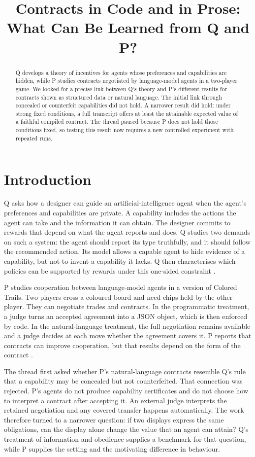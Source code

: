 \documentclass{article}
\title{Contracts in Code and in Prose: What Can Be Learned from Q and P?}
\author{}
\date{}
\begin{document}
\maketitle

\begin{abstract}
Q develops a theory of incentives for agents whose preferences and capabilities are hidden, while P studies contracts negotiated by language-model agents in a two-player game. We looked for a precise link between Q's theory and P's different results for contracts shown as structured data or natural language. The initial link through concealed or counterfeit capabilities did not hold. A narrower result did hold: under strong fixed conditions, a full transcript offers at least the attainable expected value of a faithful compiled contract. The thread paused because P does not hold those conditions fixed, so testing this result now requires a new controlled experiment with repeated runs.
\end{abstract}

\section{Introduction}

Q asks how a designer can guide an artificial-intelligence agent when the agent's preferences and capabilities are private. A capability includes the actions the agent can take and the information it can obtain. The designer commits to rewards that depend on what the agent reports and does. Q studies two demands on such a system: the agent should report its type truthfully, and it should follow the recommended action. Its model allows a capable agent to hide evidence of a capability, but not to invent a capability it lacks. Q then characterises which policies can be supported by rewards under this one-sided constraint \cite{Q}.

P studies cooperation between language-model agents in a version of Colored Trails. Two players cross a coloured board and need chips held by the other player. They can negotiate trades and contracts. In the programmatic treatment, a judge turns an accepted agreement into a JSON object, which is then enforced by code. In the natural-language treatment, the full negotiation remains available and a judge decides at each move whether the agreement covers it. P reports that contracts can improve cooperation, but that results depend on the form of the contract \cite{P}.

The thread first asked whether P's natural-language contracts resemble Q's rule that a capability may be concealed but not counterfeited. That connection was rejected. P's agents do not produce capability certificates and do not choose how to interpret a contract after accepting it. An external judge interprets the retained negotiation and any covered transfer happens automatically. The work therefore turned to a narrower question: if two displays express the same obligations, can the display alone change the value that an agent can attain? Q's treatment of information and obedience supplies a benchmark for that question, while P supplies the setting and the motivating difference in behaviour.
\end{document}
